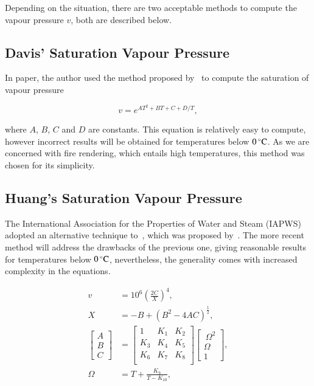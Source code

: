 Depending on the situation, there are two acceptable methods to compute the vapour pressure $v$, both are described below.

\subsection{Davis' Saturation Vapour Pressure}
\label{subsec:davis_v}

In \cite{Ciddor:1996} paper, the author used the method proposed by~\cite{Davis:1992} to compute the saturation of vapour pressure

\begin{equation}
\label{eq:davis_v}
v = e^{AT^2 + BT + C + D/T},
\end{equation}

where $A$, $B$, $C$ and $D$ are constants.
This equation is relatively easy to compute, however incorrect results will be obtained for temperatures below $0\,^{\circ}{\rm C}$.
As we are concerned with fire rendering, which entails high temperatures, this method was chosen for its simplicity.

\subsection{Huang's Saturation Vapour Pressure}
\label{subsec:huang_v}

The International Association for the Properties of Water and Steam (IAPWS) adopted an alternative technique to~\cite{Davis:1992}, which was proposed by~\cite{Huang:1998}.
The more recent method will address the drawbacks of the previous one, giving reasonable results for temperatures below $0\,^{\circ}{\rm C}$, nevertheless, the generality comes with increased complexity in the equations.

\begin{align}
\label{eq:huang_v}
v &= 10^{6} \left( \frac{2C}{X} \right)^4, \\
X &= -B + \left( B^2 - 4AC \right)^{\frac{1}{2}}, \\
\begin{bmatrix}
A \\
B \\
C
\end{bmatrix} &=
\begin{bmatrix}
1 & K_1 & K_2 \\
K_3 & K_4 & K_5 \\
K_6 & K_7 & K_8 \\
\end{bmatrix} 
\begin{bmatrix}
~\Omega^2 \\
\Omega \\
1
\end{bmatrix}, \\
\Omega &= T + \frac{K_9}{T - K_{10}},
\end{align}

